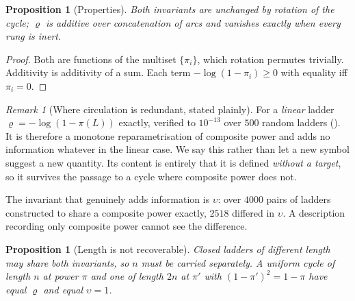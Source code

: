 \documentclass[11pt,twocolumn,a4paper]{article}
\theoremstyle{thmstyle}
\newtheorem{proposition}[theorem]{Proposition}
\theoremstyle{definition}
\theoremstyle{remark}
\newtheorem{remark}[theorem]{Remark}
\newcommand{\pow}{\pi}
\newcommand{\Lad}{L}
\newcommand{\circu}{\varrho}
\newcommand{\unif}{\upsilon}
\begin{document}
\begin{proposition}[Properties]
\label{prop:invprops}
Both invariants are unchanged by rotation of the cycle; $\circu$ is additive
over concatenation of arcs and vanishes exactly when every rung is inert.
\end{proposition}

\begin{proof}
Both are functions of the multiset $\{\pow_i\}$, which rotation permutes
trivially. Additivity is additivity of a sum. Each term $-\log(1-\pow_i)\geq0$
with equality iff $\pow_i=0$.
\end{proof}

\begin{remark}[Where circulation is redundant, stated plainly]
\label{rem:rho-honest}
For a \emph{linear} ladder $\circu = -\log(1-\pow(\Lad))$ exactly, verified to
$10^{-13}$ over $500$ random ladders (). It is therefore a
monotone reparametrisation of composite power and adds no information whatever
in the linear case. We say this rather than let a new symbol suggest a new
quantity. Its content is entirely that it is defined \emph{without a target},
so it survives the passage to a cycle where composite power does not.

The invariant that genuinely adds information is $\unif$: over $4000$ pairs of
ladders constructed to share a composite power exactly, $2518$ differed in
$\unif$. A description recording only composite power cannot see the
difference.
\end{remark}

\begin{proposition}[Length is not recoverable]
\label{prop:length}
Closed ladders of different length may share both invariants, so $n$ must be
carried separately. A uniform cycle of length $n$ at power $\pow$ and one of
length $2n$ at $\pow'$ with $(1-\pow')^2 = 1-\pow$ have equal $\circu$ and
equal $\unif=1$.
\end{proposition}
\end{document}
